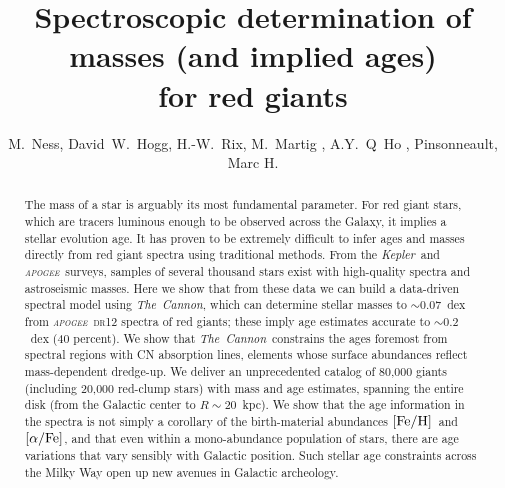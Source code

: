 \documentclass[12pt, preprint]{aastex}
\newcommand{\project}[1]{\textsl{#1}}
\newcommand{\tc}{\project{The~Cannon}}
\newcommand{\apogee}{\project{\textsc{apogee}}}
\newcommand{\kepler}{\project{Kepler}}
\newcommand{\feh}{\mbox{$\rm [Fe/H]$}}
\newcommand{\alphafe}{\mbox{$\rm [\alpha/Fe]$}}
\begin{document}
\title{Spectroscopic determination of masses (and implied ages) \\for red giants}
\author{M.~Ness,
        David~W.~Hogg,
        H.-W.~Rix,
        M.~Martig , 
        A.Y.~Q~Ho ,
        Pinsonneault, Marc H. }

\begin{abstract}%
The mass of a star is arguably its most fundamental parameter.
For red giant stars, which are tracers luminous enough to be observed
across the Galaxy, it implies a stellar evolution age.
It has proven to be extremely difficult to infer ages and masses directly from red giant spectra using traditional methods.
From the \kepler\ and \apogee\ surveys, samples of several thousand
stars exist with high-quality spectra and astroseismic masses.
Here we show that from these data we can build a data-driven spectral
model using \tc, which can determine stellar masses to $\sim 0.07$~dex
from \apogee\ \textsc{dr12} spectra of red giants; these imply age
estimates accurate to $\sim 0.2$~dex (40 percent).
We show that \tc\ constrains the ages foremost from spectral regions
with CN absorption lines, elements whose surface abundances reflect
mass-dependent dredge-up.
We deliver an unprecedented catalog of 80,000 giants (including 20,000
red-clump stars) with mass and age estimates, spanning the entire disk
(from the Galactic center to $R\sim 20$~kpc).
We show that the age information in the spectra is not simply a
corollary of the birth-material abundances \feh\ and \alphafe, and
that even within a mono-abundance population of stars, there are age
variations that vary sensibly with Galactic position.
Such stellar age constraints across the Milky Way open up new avenues
in Galactic archeology.
\end{abstract}
\end{document}
